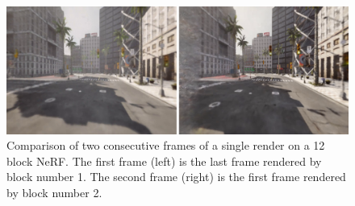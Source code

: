 \begin{figure}[!h]
    \centering
    \includegraphics[width=1.0\textwidth]{figures/block-nerf-frame-comparison.png}
    \caption{Comparison of two consecutive frames of a single render on a 12 block NeRF. The first frame (left) is the last frame rendered by block number 1. The second frame (right) is the first frame rendered by block number 2.}
    \label{fig:block-nerf-frame-comparison}
\end{figure}